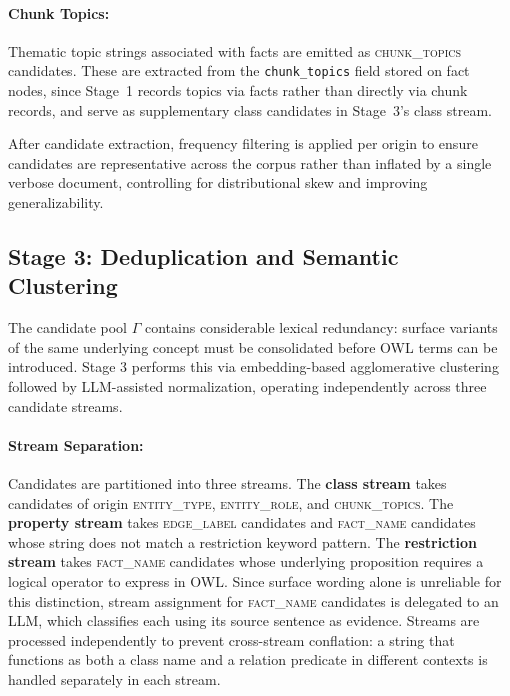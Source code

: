 \documentclass[sigconf]{acmart}
\begin{document}
\vspace{-0.5em}
\paragraph{\textbf{Chunk Topics:}}
Thematic topic strings associated with facts are emitted as 
\textsc{chunk\_topics} candidates. These are extracted from the 
\texttt{chunk\_topics} field stored on fact nodes, since Stage~1 records topics 
via facts rather than directly via chunk records, and serve as supplementary 
class candidates in Stage~3's class stream.

After candidate extraction, frequency filtering is applied per origin 
to ensure candidates are representative across the corpus rather than inflated 
by a single verbose document, controlling for distributional skew and improving 
generalizability.




\subsection*{Stage 3: Deduplication and Semantic Clustering}
\label{subsec:stage3}

The candidate pool $\Gamma$ contains considerable lexical redundancy: surface variants of the same underlying concept must be consolidated before OWL terms can be introduced. Stage 3 performs this via embedding-based agglomerative clustering followed by LLM-assisted normalization, operating independently across three candidate streams.

\vspace{-0.5em}
\paragraph{\textbf{Stream Separation:}} Candidates are partitioned into three streams. The \textbf{class stream} takes candidates of origin \textsc{entity\_type}, \textsc{entity\_role}, and \textsc{chunk\_topics}. The \textbf{property stream} takes \textsc{edge\_label} candidates and \textsc{fact\_name} candidates whose string does not match a restriction keyword pattern. The \textbf{restriction stream} takes \textsc{fact\_name} candidates whose underlying proposition requires a logical operator to express in OWL. Since surface wording alone is unreliable for this distinction, stream assignment for \textsc{fact\_name} candidates is delegated to an LLM, which classifies each using its source sentence as evidence. Streams are processed independently to prevent cross-stream conflation: a string that functions as both a class name and a relation predicate in different contexts is handled separately in each stream.
\end{document}

